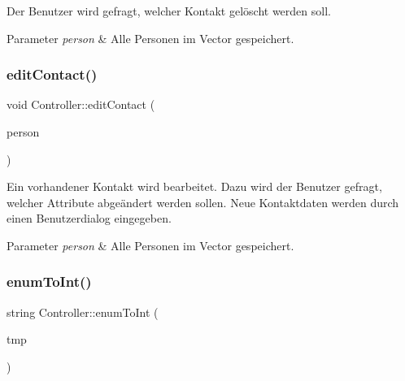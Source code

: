 Der Benutzer wird gefragt, welcher Kontakt gelöscht werden soll.


\begin{DoxyParams}{Parameter}
{\em person} & Alle Personen im Vector gespeichert.\\
\hline
\end{DoxyParams}
\mbox{\label{classContactManager_1_1Controller_a53c3a1c796234dfd8ba4778c2a0621f2}} 
\subsubsection{\texorpdfstring{edit\+Contact()}{editContact()}}
{\footnotesize\ttfamily void Controller\+::edit\+Contact (\begin{DoxyParamCaption}\item[{vector$<$ \hyperlink{classContactManager_1_1Person}{Person} $>$ \&}]{person }\end{DoxyParamCaption})}



Ein vorhandener Kontakt wird bearbeitet. Dazu wird der Benutzer gefragt, welcher Attribute abgeändert werden sollen. Neue Kontaktdaten werden durch einen Benutzerdialog eingegeben.


\begin{DoxyParams}{Parameter}
{\em person} & Alle Personen im Vector gespeichert.\\
\hline
\end{DoxyParams}
\mbox{\label{classContactManager_1_1Controller_a6989880aa8c549f03067cb7d8d1be7a6}} 
\subsubsection{\texorpdfstring{enum\+To\+Int()}{enumToInt()}}
{\footnotesize\ttfamily string Controller\+::enum\+To\+Int (\begin{DoxyParamCaption}\item[{Gender\+Type}]{tmp }\end{DoxyParamCaption})\hspace{0.3cm}{\ttfamily [static]}}



